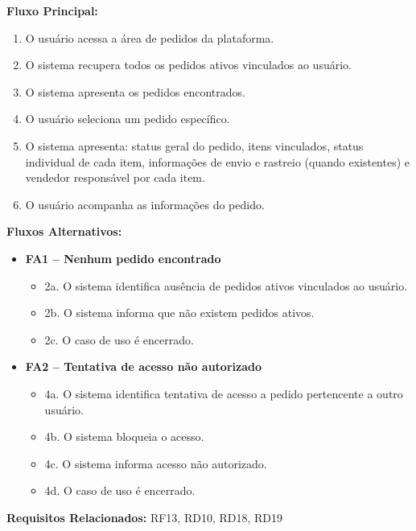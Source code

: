 ﻿\documentclass[12pt,a4paper]{article}
\begin{document}
\vspace{0.5em}
\noindent\textbf{Fluxo Principal:}
\begin{enumerate}[label=\arabic*.]
    \item O usuário acessa a área de pedidos da plataforma.
    \item O sistema recupera todos os pedidos ativos vinculados ao usuário.
    \item O sistema apresenta os pedidos encontrados.
    \item O usuário seleciona um pedido específico.
    \item O sistema apresenta: status geral do pedido, itens vinculados, status individual de cada item, informações de envio e rastreio (quando existentes) e vendedor responsável por cada item.
    \item O usuário acompanha as informações do pedido.
\end{enumerate}

\vspace{0.5em}
\noindent\textbf{Fluxos Alternativos:}
\begin{itemize}[leftmargin=*]
    \item \textbf{FA1 – Nenhum pedido encontrado}
    \begin{itemize}[label={}, leftmargin=0.5cm]
        \item 2a. O sistema identifica ausência de pedidos ativos vinculados ao usuário.
        \item 2b. O sistema informa que não existem pedidos ativos.
        \item 2c. O caso de uso é encerrado.
    \end{itemize}
    
    \item \textbf{FA2 – Tentativa de acesso não autorizado}
    \begin{itemize}[label={}, leftmargin=0.5cm]
        \item 4a. O sistema identifica tentativa de acesso a pedido pertencente a outro usuário.
        \item 4b. O sistema bloqueia o acesso.
        \item 4c. O sistema informa acesso não autorizado.
        \item 4d. O caso de uso é encerrado.
    \end{itemize}
\end{itemize}

\vspace{0.5em}
\noindent\textbf{Requisitos Relacionados:} RF13, RD10, RD18, RD19
\end{document}
